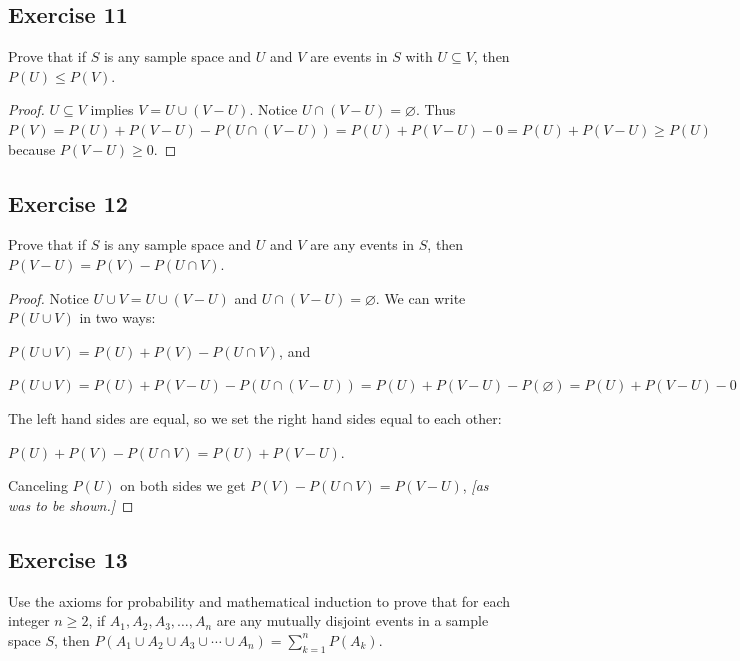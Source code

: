 \documentclass[14pt]{extarticle}
\newcommand{\es}{\varnothing}
\begin{document}
\subsection{Exercise 11}
Prove that if \(S\) is any sample space and \(U\) and \(V\) are events in \(S\) with \(U \subseteq V\), then \(P(U) \leq
P(V)\).

\begin{proof}
     \(U \subseteq V\) implies \(V = U \cup (V - U)\). Notice \(U \cap (V - U) = \es\). Thus \(P(V) = P(U) + P(V-U) - P(U \cap
     (V-U)) = P(U) + P(V-U) - 0 = P(U) + P(V-U) \geq P(U)\) because \(P(V-U) \geq 0\).
\end{proof}

\subsection{Exercise 12}
Prove that if \(S\) is any sample space and \(U\) and \(V\) are any events in \(S\), then \(P(V-U) = P(V) - P(U \cap V)\).

\begin{proof}
     Notice \(U \cup V = U \cup (V - U)\) and \(U \cap (V-U) = \es\). We can write \(P(U \cup V)\) in two ways:

     \(P(U \cup V) = P(U) + P(V) - P(U \cap V)\), and

     \(P(U \cup V) = P(U) + P(V-U) - P(U \cap (V-U)) = P(U) + P(V-U) - P(\es) = P(U) + P(V-U) - 0 = P(U) + P(V-U)\)

     The left hand sides are equal, so we set the right hand sides equal to each other:

     \(P(U) + P(V) - P(U \cap V) = P(U) + P(V-U)\).

     Canceling \(P(U)\) on both sides we get \(P(V) - P(U \cap V) = P(V-U)\), {\it [as was to be shown.]}
\end{proof}

\subsection{Exercise 13}
Use the axioms for probability and mathematical induction to prove that for each integer \(n \geq 2\), if \(A_1, A_2, A_3,
\ldots, A_n\) are any mutually disjoint events in a sample space \(S\), then \(P(A_1 \cup A_2 \cup A_3 \cup \cdots \cup
A_n) = \sum_{k=1}^n P(A_k)\).
\end{document}

